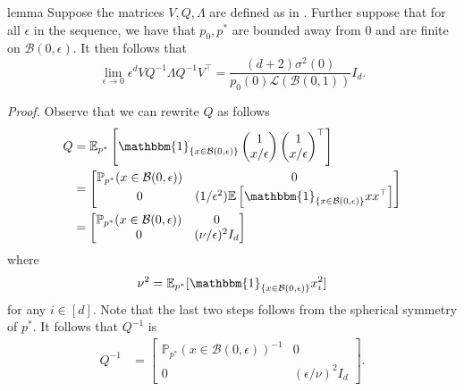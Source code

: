 \documentclass[11pt]{article}
\begin{document}
\begin{restatable}{lemma}{} \label{lemma: asymptotic var bound}
    Suppose the matrices $V, Q, \Lambda$ are defined as in . Further suppose that for all $\epsilon$ in the sequence, we have that $p_0, p^*$ are bounded away from $0$ and are finite on $\mathcal{B}(0, \epsilon)$. It then follows that
    \[ \lim_{\epsilon \rightarrow 0}\epsilon^dVQ^{-1}\Lambda Q^{-1}V^{\top} = \frac{(d+2)\sigma^2(0)}{p_0(0)\mathcal{L}(\mathcal{B}(0,1))}I_d.\]
\end{restatable}
\noindent \textit{Proof.} Observe that we can rewrite $Q$ as follows
\begin{align*}
    Q &= \mathbb{E}_{p^*}\left[\mathbbm{1}_{\{x \in \mathcal{B}(0, \epsilon)\}}\begin{pmatrix}
        1 \\ x/\epsilon
    \end{pmatrix}\begin{pmatrix}
        1 \\ x/\epsilon
    \end{pmatrix}^{\top}\right] \\
    &= \begin{bmatrix}
         \mathbb{P}_{p^*}(x \in \mathcal{B}(0, \epsilon)) & 0 \\
         0 & (1/\epsilon^2)\mathbb{E}\left[\mathbbm{1}_{\{x \in \mathcal{B}(0, \epsilon)\}}xx^{\top}\right]
    \end{bmatrix} \\
    &= \begin{bmatrix}
         \mathbb{P}_{p^*}(x \in \mathcal{B}(0, \epsilon)) & 0 \\
         0 & (\nu/\epsilon)^2I_d
    \end{bmatrix}
\end{align*}
where
\begin{equation*}
\nu^2 = \mathbb{E}_{p^*}[\mathbbm{1}_{\{x \in \mathcal{B}(0, \epsilon)\}}x_i^2]
\end{equation*}
for any $i \in [d]$. Note that the last two steps follows from the spherical symmetry of $p^*$. It follows that $Q^{-1}$ is
\begin{align} \label{eq: Q closed form}
    Q^{-1} &= \begin{bmatrix}
         \mathbb{P}_{p^*}(x \in \mathcal{B}(0, \epsilon))^{-1} & 0 \\
         0 & (\epsilon/\nu)^{2}I_d
    \end{bmatrix}.
\end{align}
\end{document}
